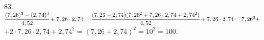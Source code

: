 83. $\cfrac{(7,26)^3-(2,74)^3}{4,52}+7,26\cdot2,74=\cfrac{(7,26-2,74)(7,26^2+7,26\cdot2,74+2,74^2)}{4,52}+7,26\cdot2,74=
7,26^2+$\\$+2\cdot7,26\cdot2,74+2,74^2=(7,26+2,74)^2=10^2=100.$\\
